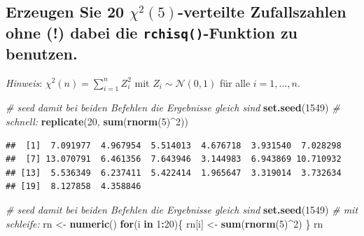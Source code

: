 \documentclass[12pt,a4paper]{article}
\newenvironment{Shaded}{\begin{snugshade}}{\end{snugshade}}
\newcommand{\CommentTok}[1]{\textcolor[rgb]{0.56,0.35,0.01}{\textit{#1}}}
\newcommand{\ControlFlowTok}[1]{\textcolor[rgb]{0.13,0.29,0.53}{\textbf{#1}}}
\newcommand{\DecValTok}[1]{\textcolor[rgb]{0.00,0.00,0.81}{#1}}
\newcommand{\FunctionTok}[1]{\textcolor[rgb]{0.13,0.29,0.53}{\textbf{#1}}}
\newcommand{\NormalTok}[1]{#1}
\newcommand{\OtherTok}[1]{\textcolor[rgb]{0.56,0.35,0.01}{#1}}
\newcommand{\SpecialCharTok}[1]{\textcolor[rgb]{0.81,0.36,0.00}{\textbf{#1}}}
\begin{document}
\subsection{\texorpdfstring{Erzeugen Sie 20 \(\chi^2(5)\)-verteilte
Zufallszahlen ohne (!) dabei die \texttt{rchisq()}-Funktion zu
benutzen.}{Erzeugen Sie 20 \textbackslash chi\^{}2(5)-verteilte Zufallszahlen ohne (!) dabei die rchisq()-Funktion zu benutzen.}}\label{erzeugen-sie-20-chi25-verteilte-zufallszahlen-ohne-dabei-die-rchisq-funktion-zu-benutzen.}

\emph{Hinweis}: \(\chi^2(n)=\sum_{i=1}^n Z_i^2\) mit
\(Z_i\sim\mathcal{N}(0,1)\) für alle \(i=1,...,n\).

\begin{Shaded}
\begin{Highlighting}[]
    \CommentTok{\# seed damit bei beiden Befehlen die Ergebnisse gleich sind}
    \FunctionTok{set.seed}\NormalTok{(}\DecValTok{1549}\NormalTok{) }
    \CommentTok{\# schnell: }
    \FunctionTok{replicate}\NormalTok{(}\DecValTok{20}\NormalTok{, }\FunctionTok{sum}\NormalTok{(}\FunctionTok{rnorm}\NormalTok{(}\DecValTok{5}\NormalTok{)}\SpecialCharTok{\^{}}\DecValTok{2}\NormalTok{))}
\end{Highlighting}
\end{Shaded}

\begin{verbatim}
##  [1]  7.091977  4.967954  5.514013  4.676718  3.931540  7.028298
##  [7] 13.070791  6.461356  7.643946  3.144983  6.943869 10.710932
## [13]  5.536349  6.237411  5.422414  1.965647  3.319014  3.732634
## [19]  8.127858  4.358846
\end{verbatim}

\begin{Shaded}
\begin{Highlighting}[]
    \CommentTok{\# seed damit bei beiden Befehlen die Ergebnisse gleich sind}
    \FunctionTok{set.seed}\NormalTok{(}\DecValTok{1549}\NormalTok{)}
    \CommentTok{\# mit schleife:}
\NormalTok{    rn }\OtherTok{\textless{}{-}} \FunctionTok{numeric}\NormalTok{()}
    \ControlFlowTok{for}\NormalTok{(i }\ControlFlowTok{in} \DecValTok{1}\SpecialCharTok{:}\DecValTok{20}\NormalTok{)\{}
\NormalTok{      rn[i] }\OtherTok{\textless{}{-}} \FunctionTok{sum}\NormalTok{(}\FunctionTok{rnorm}\NormalTok{(}\DecValTok{5}\NormalTok{)}\SpecialCharTok{\^{}}\DecValTok{2}\NormalTok{)}
\NormalTok{    \}}
\NormalTok{    rn}
\end{Highlighting}
\end{Shaded}
\end{document}
